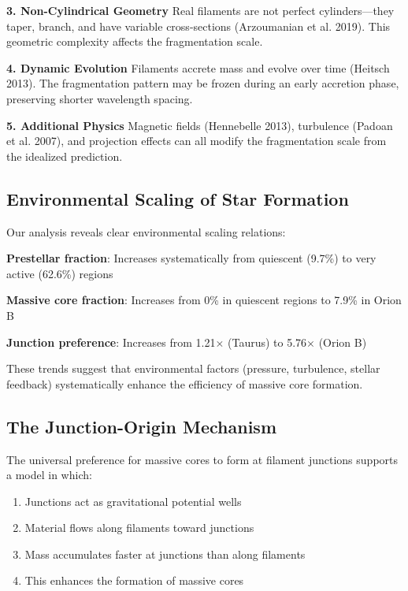 \documentclass[11pt,a4paper]{article}
\begin{document}
\textbf{3. Non-Cylindrical Geometry}
Real filaments are not perfect cylinders---they taper, branch, and have variable cross-sections (Arzoumanian et al. 2019). This geometric complexity affects the fragmentation scale.

\textbf{4. Dynamic Evolution}
Filaments accrete mass and evolve over time (Heitsch 2013). The fragmentation pattern may be frozen during an early accretion phase, preserving shorter wavelength spacing.

\textbf{5. Additional Physics}
Magnetic fields (Hennebelle 2013), turbulence (Padoan et al. 2007), and projection effects can all modify the fragmentation scale from the idealized prediction.

\subsection{Environmental Scaling of Star Formation}

Our analysis reveals clear environmental scaling relations:

\textbf{Prestellar fraction}: Increases systematically from quiescent (9.7\%) to very active (62.6\%) regions

\textbf{Massive core fraction}: Increases from 0\% in quiescent regions to 7.9\% in Orion B

\textbf{Junction preference}: Increases from 1.21$\times$ (Taurus) to 5.76$\times$ (Orion B)

These trends suggest that environmental factors (pressure, turbulence, stellar feedback) systematically enhance the efficiency of massive core formation.

\subsection{The Junction-Origin Mechanism}

The universal preference for massive cores to form at filament junctions supports a model in which:
\begin{enumerate}
    \item Junctions act as gravitational potential wells
    \item Material flows along filaments toward junctions
    \item Mass accumulates faster at junctions than along filaments
    \item This enhances the formation of massive cores
\end{enumerate}
\end{document}
